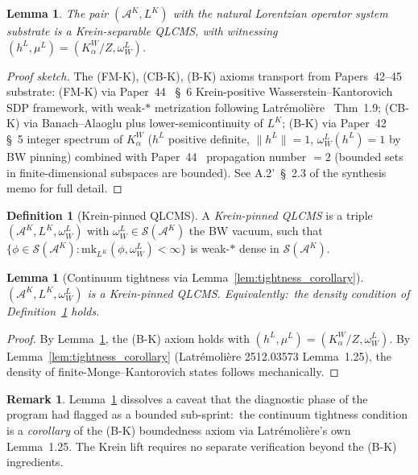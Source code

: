 \documentclass[11pt,a4paper]{article}
\theoremstyle{plain}
\newtheorem{lemma}[theorem]{Lemma}
\theoremstyle{definition}
\newtheorem{definition}[theorem]{Definition}
\newtheorem{remark}[theorem]{Remark}
\newcommand{\Acal}{\mathcal{A}}
\newcommand{\Scal}{\mathcal{S}}
\newcommand{\norm}[1]{\lVert #1 \rVert}
\newcommand{\BWvac}{\omega_{W}^{L}}
\newcommand{\Kalpha}{K_{\alpha}^{W}}
\begin{document}
\begin{lemma}\label{lem:krein_sep_qlcms_verification}
The pair $(\Acal^{K}, L^{K})$ with the natural Lorentzian operator
system substrate is a Krein-separable QLCMS, with witnessing
$(h^{L}, \mu^{L}) = (\Kalpha / Z, \BWvac)$.
\end{lemma}

\begin{proof}[Proof sketch]
The (FM-K), (CB-K), (B-K) axioms transport from Papers~42--45 substrate:
(FM-K) via Paper~44~\cite{paper44} \S~6 Krein-positive
Wasserstein--Kantorovich SDP framework, with weak-$*$ metrization
following Latr\'emoli\`ere~\cite{latremoliere2025_hypertopology}
Thm~1.9; (CB-K) via Banach--Alaoglu plus lower-semicontinuity of
$L^{K}$; (B-K) via Paper~42~\cite{paper42} \S~5 integer spectrum of
$\Kalpha$ ($h^{L}$ positive definite, $\norm{h^{L}} = 1$, $\BWvac(h^{L}) = 1$
by BW pinning) combined with Paper~44~\cite{paper44} propagation
number $= 2$ (bounded sets in finite-dimensional subspaces are bounded).
See A.2'~\S~2.3 of the synthesis memo for full detail.
\end{proof}

\begin{definition}[Krein-pinned QLCMS]\label{def:krein_pinned_qlcms}
A \emph{Krein-pinned QLCMS} is a triple $(\Acal^{K}, L^{K}, \BWvac)$
with $\BWvac \in \Scal(\Acal^{K})$ the BW vacuum, such that
$\{\phi \in \Scal(\Acal^{K}) : \mathrm{mk}_{L^{K}}(\phi, \BWvac) < \infty\}$
is weak-$*$ dense in $\Scal(\Acal^{K})$.
\end{definition}

\begin{lemma}[Continuum tightness via
Lemma~\ref{lem:tightness_corollary}]\label{lem:krein_continuum_tightness}
$(\Acal^{K}, L^{K}, \BWvac)$ is a Krein-pinned QLCMS. Equivalently:\
the density condition of Definition~\ref{def:krein_pinned_qlcms} holds.
\end{lemma}

\begin{proof}
By Lemma~\ref{lem:krein_sep_qlcms_verification}, the (B-K) axiom holds
with $(h^{L}, \mu^{L}) = (\Kalpha/Z, \BWvac)$. By
Lemma~\ref{lem:tightness_corollary} (Latr\'emoli\`ere
2512.03573 Lemma~1.25), the density of finite-Monge--Kantorovich
states follows mechanically.
\end{proof}

\begin{remark}\label{rem:tightness_dissolves}
Lemma~\ref{lem:krein_continuum_tightness} dissolves a caveat that
the diagnostic phase of the program had flagged as a bounded
sub-sprint:\ the continuum tightness condition is a \emph{corollary}
of the (B-K) boundedness axiom via Latr\'emoli\`ere's own
Lemma~1.25. The Krein lift requires no separate verification beyond
the (B-K) ingredients.
\end{remark}
\end{document}

